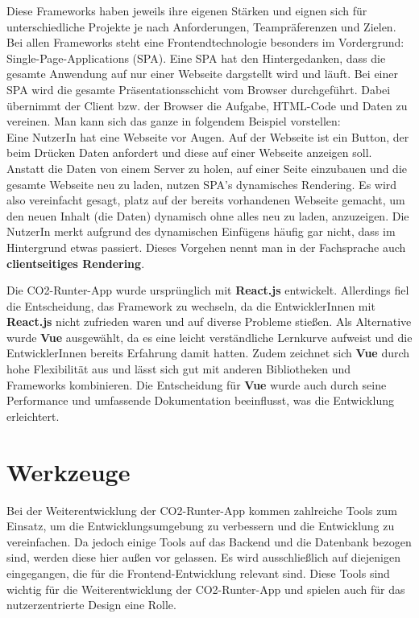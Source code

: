 Diese Frameworks haben jeweils ihre eigenen Stärken und eignen sich für unterschiedliche Projekte je nach Anforderungen, Teampräferenzen und Zielen.\cite{angular-vuejs-reactjs-comparison:3, angular-vuejs-reactjs-comparison:4}
Bei allen Frameworks steht eine Frontendtechnologie besonders im Vordergrund: Single-Page-Applications (\acs{SPA}).
Eine \acs{SPA} hat den Hintergedanken, dass die gesamte Anwendung auf nur einer Webseite dargstellt wird und läuft. \cite*{spa}
Bei einer \acs{SPA} wird die gesamte Präsentationsschicht vom Browser durchgeführt.
Dabei übernimmt der Client bzw. der Browser die Aufgabe, \acs{HTML}-Code und Daten zu vereinen. \cite{spa}
Man kann sich das ganze in folgendem Beispiel vorstellen:\\
Eine NutzerIn hat eine Webseite vor Augen. Auf der Webseite ist ein Button, der beim Drücken Daten anfordert und diese auf einer Webseite anzeigen soll.
Anstatt die Daten von einem Server zu holen, auf einer Seite einzubauen und die gesamte Webseite neu zu laden, nutzen \acs{SPA}'s dynamisches Rendering.
Es wird also vereinfacht gesagt, platz auf der bereits vorhandenen Webseite gemacht, um den neuen Inhalt (die Daten) dynamisch ohne alles neu zu laden, anzuzeigen.
Die NutzerIn merkt aufgrund des dynamischen Einfügens häufig gar nicht, dass im Hintergrund etwas passiert.
Dieses Vorgehen nennt man in der Fachsprache auch \textbf{clientseitiges Rendering}.

Die CO2-Runter-App wurde ursprünglich mit \textbf{React.js} entwickelt. Allerdings fiel die Entscheidung, das Framework zu wechseln, da die EntwicklerInnen mit \textbf{React.js} nicht zufrieden waren und auf diverse Probleme stießen. Als Alternative wurde \textbf{Vue} ausgewählt, da es eine leicht verständliche Lernkurve aufweist und die EntwicklerInnen bereits Erfahrung damit hatten. Zudem zeichnet sich \textbf{Vue} durch hohe Flexibilität aus und lässt sich gut mit anderen Bibliotheken und Frameworks kombinieren. Die Entscheidung für \textbf{Vue} wurde auch durch seine Performance und umfassende Dokumentation beeinflusst, was die Entwicklung erleichtert.

\section{Werkzeuge}
\label{chapter:3-werkzeuge}

Bei der Weiterentwicklung der CO2-Runter-App kommen zahlreiche Tools zum Einsatz, um die Entwicklungsumgebung zu verbessern und die Entwicklung zu vereinfachen. Da jedoch einige Tools auf das Backend und die Datenbank bezogen sind, werden diese hier außen vor gelassen. Es wird ausschließlich auf diejenigen eingegangen, die für die Frontend-Entwicklung relevant sind. Diese Tools sind wichtig für die Weiterentwicklung der CO2-Runter-App und spielen auch für das nutzerzentrierte Design eine Rolle.

